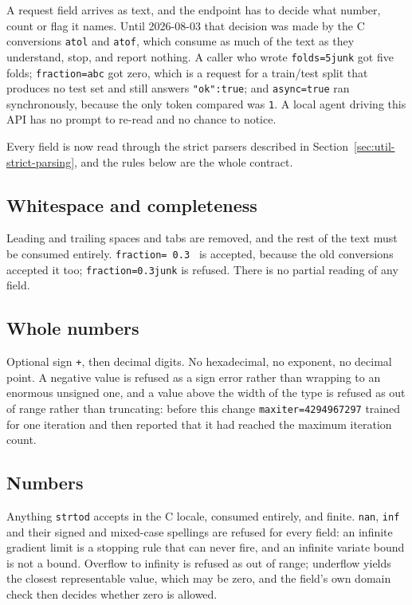 A request field arrives as text, and the endpoint has to decide what
number, count or flag it names.  Until 2026-08-03 that decision was made
by the C conversions \texttt{atol} and \texttt{atof}, which consume as
much of the text as they understand, stop, and report nothing.  A caller
who wrote \texttt{folds=5junk} got five folds; \texttt{fraction=abc} got
zero, which is a request for a train/test split that produces no test
set and still answers \texttt{"ok":true}; and \texttt{async=true} ran
synchronously, because the only token compared was \texttt{1}.  A local
agent driving this API has no prompt to re-read and no chance to notice.

Every field is now read through the strict parsers described in
Section~\ref{sec:util-strict-parsing}, and the rules below are the whole
contract.

\subsection*{Whitespace and completeness}
Leading and trailing spaces and tabs are removed, and the rest of the
text must be consumed entirely.  \texttt{fraction=~0.3~} is accepted,
because the old conversions accepted it too; \texttt{fraction=0.3junk}
is refused.  There is no partial reading of any field.

\subsection*{Whole numbers}
Optional sign \texttt{+}, then decimal digits.  No hexadecimal, no
exponent, no decimal point.  A negative value is refused as a sign
error rather than wrapping to an enormous unsigned one, and a value
above the width of the type is refused as out of range rather than
truncating: before this change \texttt{maxiter=4294967297} trained for
one iteration and then reported that it had reached the maximum
iteration count.

\subsection*{Numbers}
Anything \texttt{strtod} accepts in the C locale, consumed entirely, and
finite.  \texttt{nan}, \texttt{inf} and their signed and mixed-case
spellings are refused for every field: an infinite gradient limit is a
stopping rule that can never fire, and an infinite variate bound is not
a bound.  Overflow to infinity is refused as out of range; underflow
yields the closest representable value, which may be zero, and the
field's own domain check then decides whether zero is allowed.


